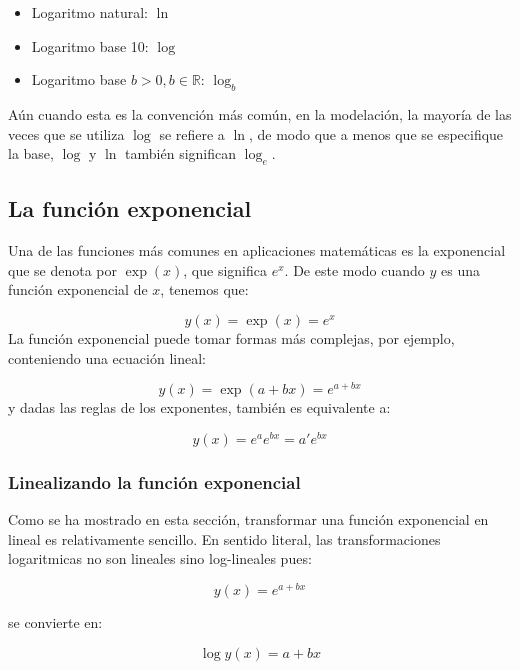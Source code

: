\documentclass[
]{book}
\providecommand{\tightlist}{%
  \setlength{\itemsep}{0pt}\setlength{\parskip}{0pt}}
\begin{document}
\begin{itemize}
\tightlist
\item
  Logaritmo natural: \(\ln\)
\item
  Logaritmo base 10: \(\log\)
\item
  Logaritmo base \(b > 0, b \in \mathbb{R}\): \(\log_b\)
\end{itemize}

Aún cuando esta es la convención más común, en la modelación, la mayoría de las veces que se utiliza \(\log\) se refiere a \(\ln\), de modo que a menos que se especifique la base, \(\log\) y \(\ln\) también significan \(\log_e\).

\hypertarget{la-funciuxf3n-exponencial}{%
\subsection{La función exponencial}\label{la-funciuxf3n-exponencial}}

Una de las funciones más comunes en aplicaciones matemáticas es la exponencial que se denota por \(\exp(x)\), que significa \(e^x\). De este modo cuando \(y\) es una función exponencial de \(x\), tenemos que:

\[y(x) = \exp(x) = e^x\]
La función exponencial puede tomar formas más complejas, por ejemplo, conteniendo una ecuación lineal:

\[y(x) = \exp(a + bx) = e^{a + bx}\]
y dadas las reglas de los exponentes, también es equivalente a:

\[y(x) = e^a e^{bx} = a' e^{bx}\]

\hypertarget{linealizando-la-funciuxf3n-exponencial}{%
\subsubsection{Linealizando la función exponencial}\label{linealizando-la-funciuxf3n-exponencial}}

Como se ha mostrado en esta sección, transformar una función exponencial en lineal es relativamente sencillo. En sentido literal, las transformaciones logaritmicas no son lineales sino log-lineales pues:

\begin{equation}
    y(x) = e^{a + bx} \label{eq:expon}
\end{equation}

se convierte en:

\begin{equation}
    \log y(x) = a + bx \label{eq:log-lin}
\end{equation}
\end{document}
